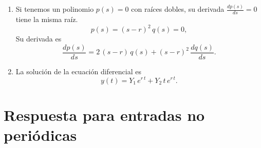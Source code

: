 \begin{enumerate}
\item Si tenemos un polinomio $p(s) = 0$ con raíces dobles, 
su derivada $\frac{dp(s)}{ds} = 0$ tiene la misma raíz.
\begin{equation}
 p(s) = (s - r)^{2} \, q(s) = 0,
\end{equation}
Su derivada es
\begin{equation}
 \frac{dp(s)}{ds} = 2 \, (s -r) \, q(s) + (s - r)^{2} \, \frac{dq(s)}{ds}.
\end{equation}

\item La solución de la ecuación diferencial es
\begin{equation}
 y(t) = Y_{1} \, e^{r \, t} + Y_{2} \, t \, e^{r \, t}.
\end{equation}


\end{enumerate}

\section{Respuesta para entradas no peri\'{o}dicas}

